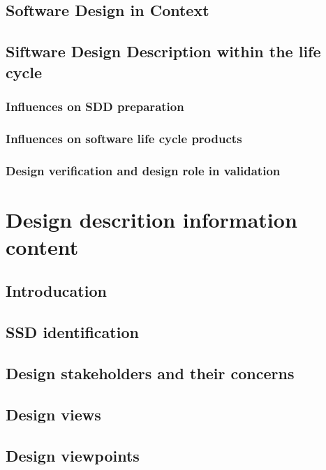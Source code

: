 \documentclass{scrreprt}
\begin{document}
\section{Software Design in Context}

\section{Siftware Design Description within the life cycle}

\subsection{Influences on SDD preparation}

\subsection{Influences on software life cycle products}

\subsection{Design verification and design role in validation}

\chapter{Design descrition information content}

\section{Introducation}

\section{SSD identification}

\section{Design stakeholders and their concerns}

\section{Design views}

\section{Design viewpoints}
\end{document}
